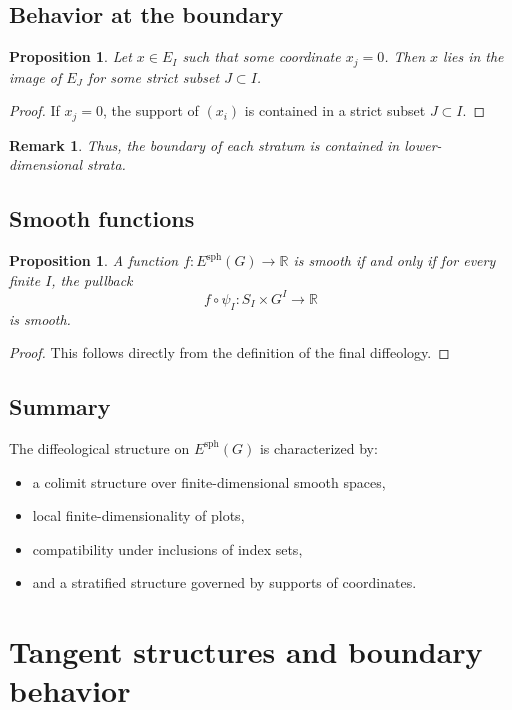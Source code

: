 \documentclass[11pt]{amsart}
\newtheorem{proposition}[theorem]{Proposition}
\newtheorem{remark}[theorem]{Remark}
\begin{document}
\subsection{Behavior at the boundary}

\begin{proposition}
Let $x \in E_I$ such that some coordinate $x_j = 0$. Then $x$ lies in the image of $E_J$ for some strict subset $J \subset I$.
\end{proposition}

\begin{proof}
If $x_j = 0$, the support of $(x_i)$ is contained in a strict subset $J \subset I$.
\end{proof}

\begin{remark}
Thus, the boundary of each stratum is contained in lower-dimensional strata.
\end{remark}

\subsection{Smooth functions}

\begin{proposition}
A function $f : E^{\mathrm{sph}}(G) \to \mathbb{R}$ is smooth if and only if for every finite $I$, the pullback
\[
f \circ \psi_I : S_I \times G^I \to \mathbb{R}
\]
is smooth.
\end{proposition}

\begin{proof}
This follows directly from the definition of the final diffeology.
\end{proof}

\subsection{Summary}

The diffeological structure on $E^{\mathrm{sph}}(G)$ is characterized by:
\begin{itemize}
\item a colimit structure over finite-dimensional smooth spaces,
\item local finite-dimensionality of plots,
\item compatibility under inclusions of index sets,
\item and a stratified structure governed by supports of coordinates.
\end{itemize}
\section{Tangent structures and boundary behavior} \label{5}
\end{document}

